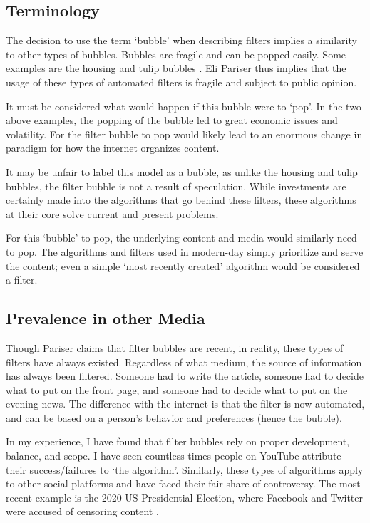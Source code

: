 \documentclass[12pt]{article}
\begin{document}
\subsection{Terminology}
The decision to use the term `bubble' when describing filters implies a
similarity to other types of bubbles. Bubbles are fragile and can be popped
easily. Some examples are the housing \cite{publications2006us} and tulip
bubbles \cite{dash2011tulipomania}. Eli Pariser thus implies that the usage of
these types of automated filters is fragile and subject to public opinion.

It must be considered what would happen if this bubble were to `pop'. In the two
above examples, the popping of the bubble led to great economic issues and
volatility. For the filter bubble to pop would likely lead to an enormous change
in paradigm for how the internet organizes content.

It may be unfair to label this model as a bubble, as unlike the housing and
tulip bubbles, the filter bubble is not a result of speculation. While
investments are certainly made into the algorithms that go behind these filters,
these algorithms at their core solve current and present problems.

For this `bubble' to pop, the underlying content and media would similarly need
to pop. The algorithms and filters used in modern-day simply prioritize and
serve the content; even a simple `most recently created' algorithm would be
considered a filter.

\subsection{Prevalence in other Media}
Though Pariser claims that filter bubbles are recent, in reality, these types of
filters have always existed. Regardless of what medium, the source of
information has always been filtered. Someone had to write the article, someone
had to decide what to put on the front page, and someone had to decide what to
put on the evening news. The difference with the internet is that the filter is
now automated, and can be based on a person's behavior and preferences (hence
the bubble).

In my experience, I have found that filter bubbles rely on proper development,
balance, and scope. I have seen countless times people on YouTube attribute
their success/failures to `the algorithm'. Similarly, these types of algorithms
apply to other social platforms and have faced their fair share of controversy.
The most recent example is the 2020 US Presidential Election, where Facebook and
Twitter were accused of censoring content \cite{time2021facebook}.
\end{document}

